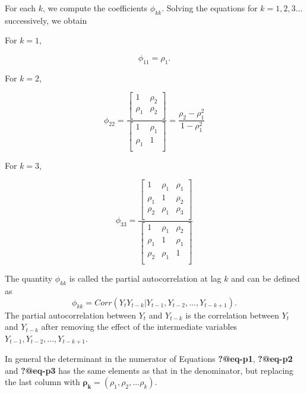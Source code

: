 \documentclass[
  11pt,
  a4paper,
]{report}
\begin{document}
For each \(k\), we compute the coefficients \(\phi_{kk}\). Solving the
equations for \(k=1, 2, 3...\) successively, we obtain

For \(k=1\),

\begin{equation}
\phi_{11}=\rho_1.
\end{equation}

For \(k=2\),

\begin{equation}
\phi_{22}=\frac{\left[\begin{array}
{rr}
1 & \rho_2  \\
\rho_1 & \rho_2  \\
\end{array}\right]}{\left[\begin{array}
{rr}
1 & \rho_1  \\
\rho_1 & 1  \\
\end{array}\right]} = \frac{\rho_2-\rho_1^2}{1-\rho_1^2}
\end{equation}

For \(k=3\),

\begin{equation}
\phi_{33}=\frac{\left[\begin{array}
{rrr}
1 & \rho_1 & \rho_1  \\
\rho_1 & 1 & \rho_2  \\
\rho_2 & \rho_1 & \rho_3  \\
\end{array}\right]}{\left[\begin{array}
{rrr}
1 & \rho_1 & \rho_2  \\
\rho_1 & 1 & \rho_1  \\
\rho_2 & \rho_1 & 1  \\
\end{array}\right]}
\end{equation}

The quantity \(\phi_{kk}\) is called the partial autocorrelation at lag
\(k\) and can be defined as
\[\phi_{kk}=Corr(Y_tY_{t-k}|Y_{t-1}, Y_{t-2},..., Y_{t-k+1}).\] The
partial autocorrelation between \(Y_t\) and \(Y_{t-k}\) is the
correlation between \(Y_t\) and \(Y_{t-k}\) after removing the effect of
the intermediate variables \(Y_{t-1}, Y_{t-2}, ..., Y_{t-k+1}\).

In general the determinant in the numerator of Equations
\textbf{?@eq-p1}, \textbf{?@eq-p2} and \textbf{?@eq-p3} has the same
elements as that in the denominator, but replacing the last column with
\(\bm{\rho_k}= (\rho_1, \rho_2,...\rho_k).\)
\end{document}
